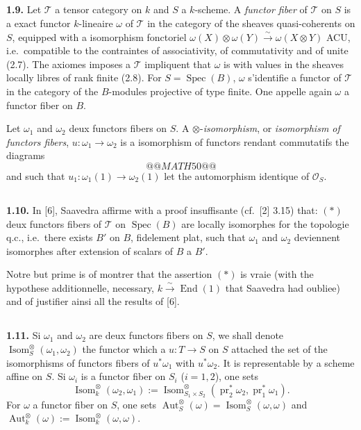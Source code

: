 \documentclass[12pt,a4paper]{article}
\theoremstyle{plain}
\theoremstyle{definition}
\theoremstyle{remark}
\DeclareMathOperator{\End}{End}
\DeclareMathOperator{\Aut}{Aut}
\DeclareMathOperator{\Isom}{Isom}
\DeclareMathOperator{\Spec}{Spec}
\DeclareMathOperator{\pr}{pr}
\begin{document}
\subsection{}

\textbf{1.9.} Let $\mathcal{T}$ a tensor category on $k$ and $S$ a $k$-scheme. A \emph{functor fiber} of $\mathcal{T}$ on $S$ is a exact functor $k$-lineaire $\omega$ of $\mathcal{T}$ in the category of the sheaves quasi-coherents on $S$, equipped with a isomorphism fonctoriel $\omega(X) \otimes \omega(Y) \xrightarrow{\sim} \omega(X \otimes Y)$ ACU, i.e.~compatible to the contraintes of associativity, of commutativity and of unite (2.7). The axiomes imposes a $\mathcal{T}$ impliquent that $\omega$ is with values in the sheaves locally libres of rank finite (2.8). For $S = \Spec(B)$, $\omega$ s'identifie a functor of $\mathcal{T}$ in the category of the $B$-modules projective of type finite. One appelle again $\omega$ a functor fiber on $B$.

Let $\omega_1$ and $\omega_2$ deux functors fibers on $S$. A $\otimes$-\emph{isomorphism}, or \emph{isomorphism of functors fibers}, $u : \omega_1 \to \omega_2$ is a isomorphism of functors rendant commutatifs the diagrams
\[
@@MATH50@@
\]
and such that $u_1 : \omega_1(1) \to \omega_2(1)$ let the automorphism identique of $\mathcal{O}_S$.

\subsection{}

\textbf{1.10.} In [6], Saavedra affirme with a proof insuffisante (cf.~[2] 3.15) that: $(*)$ deux functors fibers of $\mathcal{T}$ on $\Spec(B)$ are locally isomorphes for the topologie q.c., i.e.~there exists $B'$ on $B$, fidelement plat, such that $\omega_1$ and $\omega_2$ deviennent isomorphes after extension of scalars of $B$ a $B'$.

Notre but prime is of montrer that the assertion $(*)$ is vraie (with the hypothese additionnelle, necessary, $k \xrightarrow{\sim} \End(1)$ that Saavedra had oubliee) and of justifier ainsi all the results of [6].

\subsection{}

\textbf{1.11.} Si $\omega_1$ and $\omega_2$ are deux functors fibers on $S$, we shall denote $\Isom^\otimes_S(\omega_1,\omega_2)$ the functor which a $u : T \to S$ on $S$ attached the set of the isomorphisms of functors fibers of $u^*\omega_1$ with $u^*\omega_2$. It is representable by a scheme affine on $S$. Si $\omega_i$ is a functor fiber on $S_i$ ($i = 1,2$), one sets
\[
\Isom^\otimes_k(\omega_2,\omega_1) := \Isom^\otimes_{S_1 \times S_2}(\pr_2^*\omega_2, \pr_1^*\omega_1).
\]
For $\omega$ a functor fiber on $S$, one sets $\Aut^\otimes_S(\omega) = \Isom^\otimes_S(\omega,\omega)$ and $\Aut^\otimes_k(\omega) := \Isom^\otimes_k(\omega,\omega)$.
\end{document}
